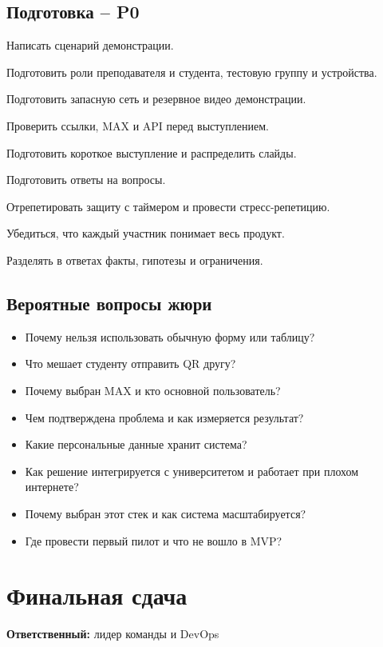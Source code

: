 \documentclass[11pt,a4paper]{article}
\newcommand{\PZero}{\textcolor{PZero}{\textbf{P0}}}
\newcommand{\owner}[1]{\textcolor{Muted}{\textbf{Ответственный:} #1}}
\begin{document}
\subsection{Подготовка -- \PZero}
\begin{tasklist}
  \item Написать сценарий демонстрации.
  \item Подготовить роли преподавателя и студента, тестовую группу и устройства.
  \item Подготовить запасную сеть и резервное видео демонстрации.
  \item Проверить ссылки, MAX и API перед выступлением.
  \item Подготовить короткое выступление и распределить слайды.
  \item Подготовить ответы на вопросы.
  \item Отрепетировать защиту с таймером и провести стресс-репетицию.
  \item Убедиться, что каждый участник понимает весь продукт.
  \item Разделять в ответах факты, гипотезы и ограничения.
\end{tasklist}

\subsection{Вероятные вопросы жюри}
\begin{itemize}
  \item Почему нельзя использовать обычную форму или таблицу?
  \item Что мешает студенту отправить QR другу?
  \item Почему выбран MAX и кто основной пользователь?
  \item Чем подтверждена проблема и как измеряется результат?
  \item Какие персональные данные хранит система?
  \item Как решение интегрируется с университетом и работает при плохом интернете?
  \item Почему выбран этот стек и как система масштабируется?
  \item Где провести первый пилот и что не вошло в MVP?
\end{itemize}

\section{Финальная сдача}
\owner{лидер команды и DevOps}
\end{document}
